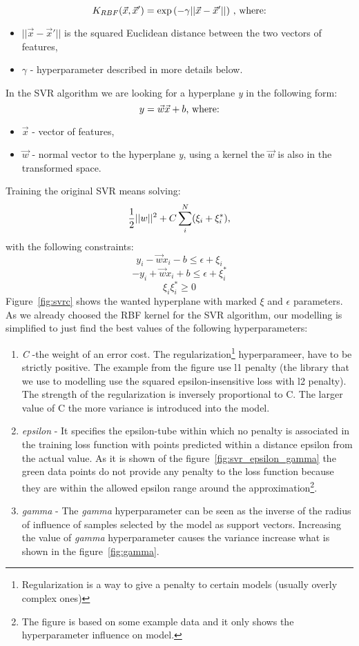 \[ K_{RBF}(\vec{x}, \vec{x}') = \exp{(-\gamma||\vec{x} - \vec{x}'||)}\ \textnormal{, where:}\]
\begin{itemize}
	\item $ ||\vec{x} - \vec{x}'|| $ is the squared Euclidean distance between the two vectors of features,\newline
	\item $ \gamma $ - hyperparameter described in more details below.
\end{itemize}
In the SVR algorithm we are looking for a hyperplane \textit{y} in the following form:
\[ y = \vec{w} \vec{x} + b \textnormal{, where:}\]
\begin{itemize}
	\item $ \vec{x} $ - vector of features,
	\item $ \vec{w} $ - normal vector to the hyperplane \textit{y}, using a kernel the $ \vec{w} $ is also in the transformed space.
\end{itemize}
Training the original SVR means solving:
\[ \frac{1}{2}||w||^2  + C \sum_{i}^{N}(\xi_i+\xi_i^*) \textnormal{,}\]
with the following constraints:
\[ y_i - \vec{w}x_i - b \le \epsilon + \xi_i  \]
\[ -y_i + \vec{w}x_i + b \le \epsilon + \xi_i^*  \]
\[ \xi_i \xi_i^* \ge 0 \]
Figure~\ref{fig:svrc} shows the wanted hyperplane with marked \textit{$\xi$} and \textit{$\epsilon$} parameters.
As we already choosed the RBF kernel for the SVR algorithm, our modelling is simplified to just find the best values of the following hyperparameters\cite{svr}:
\begin{enumerate}
	\item \textit{C} -the weight of an error cost. The regularization\footnote{Regularization is a way to give a penalty to certain models (usually overly complex ones)} hyperparameer, have to be strictly positive. The example from the figure use l1 penalty (the library that we use to modelling use the squared epsilon-insensitive loss with l2 penalty). The strength of the regularization is inversely proportional to C. The larger value of C the more variance is introduced into the model. 
	\item \textit{epsilon} - It specifies the epsilon-tube within which no penalty is associated in the training loss function with points predicted within a distance epsilon from the actual value. As it is shown of the figure~\ref{fig:svr_epsilon_gamma} the green data points do not provide any penalty to the loss function because they are within the allowed epsilon range around the approximation\footnote{\label{figure_example}The figure is based on some example data and it only shows the hyperparameter influence on model.}.
	\item \textit{gamma} - The \textit{gamma} hyperparameter can be seen as the inverse of the radius of influence of samples selected by the model as support vectors. Increasing the value of \textit{gamma} hyperparameter causes the variance increase what is shown in the figure~\ref{fig:gamma}.
	
\end{enumerate}
